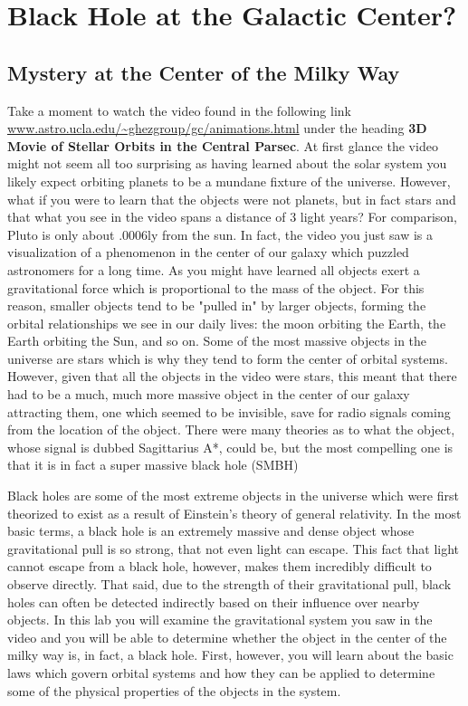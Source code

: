 \chapter{Black Hole at the Galactic Center?}

\section{Mystery at the Center of the Milky Way}
Take a moment to watch the video found in the following link \url{www.astro.ucla.edu/~ghezgroup/gc/animations.html} under the heading \textbf{3D Movie of Stellar Orbits in the Central Parsec}. At first glance the video might not seem all too surprising as having learned about the solar system you likely expect orbiting planets to be a mundane fixture of the universe. However, what if you were to learn that the objects were not planets, but in fact stars and that what you see in the video spans a distance of 3 light years? For comparison, Pluto is only about .0006ly from the sun. In fact, the video you just saw is a visualization of a phenomenon in the center of our galaxy which puzzled astronomers for a long time. As you might have learned all objects exert a gravitational force which is proportional to the mass of the object. For this reason, smaller objects tend to be "pulled in" by larger objects, forming the orbital relationships we see in our daily lives: the moon orbiting the Earth, the Earth orbiting the Sun, and so on. Some of the most massive objects in the universe are stars which is why they tend to form the center of orbital systems. However, given that all the objects in the video were stars, this meant that there had to be a much, much more massive object in the center of our galaxy attracting them, one which seemed to be invisible, save for radio signals coming from the location of the object. There were many theories as to what the object, whose signal is dubbed Sagittarius A*, could  be, but the most compelling one is that it is in fact a super massive black hole (SMBH)

Black holes are some of the most extreme objects in the universe which were first theorized to exist as a result of Einstein's theory of general relativity. In the most basic terms, a black hole is an extremely massive and dense object whose gravitational pull is so strong, that not even light can escape. This fact that light cannot escape from a black hole,  however, makes them incredibly difficult to observe directly. That said, due to the strength of their gravitational pull, black holes can often be detected indirectly based on their influence over nearby objects. In this lab you will examine the gravitational system you saw in the video and you will be able to determine whether the object in the center of the milky way is, in fact, a black hole. First, however, you will learn about the basic laws which govern orbital systems and how they can be applied to determine some of the physical properties of the objects in the system.

